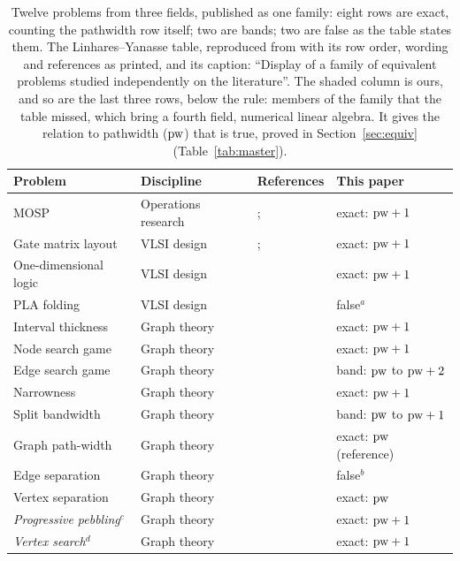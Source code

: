 \begin{table}[tbp]
\centering
\caption{Twelve problems from three fields, published as one family: eight
rows are exact, counting the pathwidth row itself; two are bands; two are false
as the table states them. The Linhares--Yanasse table, reproduced from
\citet[Table~1, p.~1764]{LY2002} with its row order, wording and references as
printed, and its caption: ``Display of a family of equivalent problems studied
independently on the literature''. The shaded column is ours, and so are the last three rows, below the rule:
members of the family that the table missed, which bring a fourth field,
numerical linear algebra. It gives the
relation to pathwidth ($\mathrm{pw}$) that is true, proved in Section~\ref{sec:equiv}
(Table~\ref{tab:master}).}
\label{tab:ly2002}
\small
\setlength{\tabcolsep}{3.5pt}
\begin{tabular}{@{}lll>{\columncolor{black!7}}l@{}}
\toprule
Problem & Discipline & References & This paper \\
\midrule
MOSP & Operations research & \citet{Yanasse1997b}; \citet{LY2002ref4} & exact: $\mathrm{pw}+1$ \\
Gate matrix layout & VLSI design & \citet{LY2002ref6}; \citet{LY2002ref8} & exact: $\mathrm{pw}+1$ \\
One-dimensional logic & VLSI design & \citet{LY2002ref7} & exact: $\mathrm{pw}+1$ \\
PLA folding & VLSI design & \citet{LY2002ref6} & false$^{a}$ \\
Interval thickness & Graph theory & \citet{LY2002ref5} & exact: $\mathrm{pw}+1$ \\
Node search game & Graph theory & \citet{LY2002ref9} & exact: $\mathrm{pw}+1$ \\
Edge search game & Graph theory & \citet{LY2002ref10} & band: $\mathrm{pw}$ to $\mathrm{pw}+2$ \\
Narrowness & Graph theory & \citet{LY2002ref11} & exact: $\mathrm{pw}+1$ \\
Split bandwidth & Graph theory & \citet{LY2002ref12} & band: $\mathrm{pw}$ to $\mathrm{pw}+1$ \\
Graph path-width & Graph theory & \citet{LY2002ref13} & exact: $\mathrm{pw}$ (reference) \\
Edge separation & Graph theory & \citet{LY2002ref14} & false$^{b}$ \\
Vertex separation & Graph theory & \citet{LY2002ref13} & exact: $\mathrm{pw}$ \\
\midrule
\emph{Progressive pebbling}$^{c}$ & Graph theory & \citet{LY2002ref10} & exact: $\mathrm{pw}+1$ \\
\emph{Vertex search}$^{d}$ & Graph theory & \citet{BRST1991} & exact: $\mathrm{pw}+1$ \\

\end{tabular}
\end{table}

